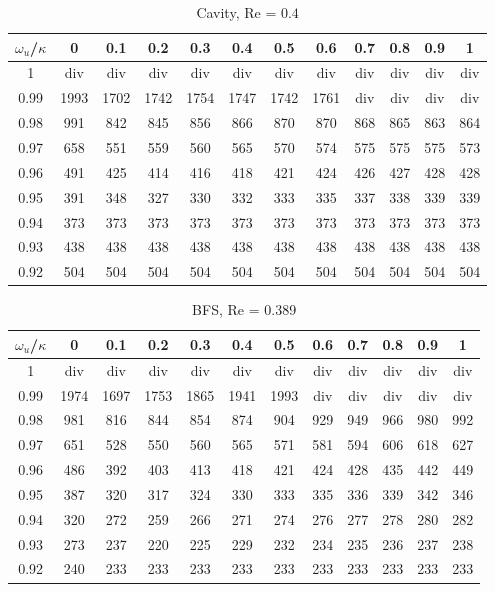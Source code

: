 \documentclass[final,3p,times,10pt,onecolumn]{myElsarticle}
\numberwithin{equation}{section}
\begin{document}
\begin{table}[t!]
\centering
\begin{tabular}{c|ccccccccccc}
\hline 
$\omega_u$/$\kappa$ & 0 & 0.1 & 0.2 & 0.3 & 0.4 & 0.5 & 0.6 & 0.7 & 0.8 & 0.9 & 1 \\ 
\hline 
1 & div & div & div & div & div & div & div & div & div & div & div \\ 
0.99 & 1993 & 1702 & 1742 & 1754 & 1747 & 1742 & 1761 & div & div & div & div \\ 
0.98 & 991 & 842  & 845 & 856 & 866 & 870 & 870 & 868 & 865 & 863 & 864 \\ 
0.97 & 658 & 551  & 559 & 560 & 565 & 570 & 574 & 575 & 575 & 575 & 573 \\ 
0.96 & 491 &425  & 414 & 416 & 418 & 421 & 424 & 426 & 427 & 428 & 428 \\ 
0.95 & 391 & 348 & 327 & 330 & 332 & 333 & 335 & 337 & 338 & 339 & 339 \\ 
0.94 & 373 & 373 & 373 & 373 & 373 & 373 & 373 & 373 & 373 & 373 & 373 \\ 
0.93 & 438 & 438 & 438 & 438 & 438 & 438 & 438 & 438 & 438 & 438 & 438 \\ 
0.92 & 504 & 504 & 504 & 504 & 504 & 504 & 504 & 504 & 504 & 504 & 504 \\ 
\hline 
\end{tabular} 
\caption{Cavity, Re = $0.4$}
\label{Table:Cavity_LowRe}
\end{table}

\begin{table}[t!]
\centering
\begin{tabular}{c|ccccccccccc}
\hline 
$\omega_u$/$\kappa$ & 0 & 0.1 & 0.2 & 0.3 & 0.4 & 0.5 & 0.6 & 0.7 & 0.8 & 0.9 & 1 \\ 
\hline 
1 & div & div & div & div & div & div & div & div & div & div & div \\ 
0.99 & 1974 & 1697 & 1753 & 1865 & 1941 & 1993 & div & div & div & div & div \\ 
0.98 & 981 & 816 & 844 & 854 & 874 & 904 & 929 & 949 & 966 & 980 & 992 \\ 
0.97 & 651 & 528 & 550 & 560 & 565 & 571 & 581 & 594 & 606 & 618 & 627 \\ 
0.96 & 486 & 392 & 403 & 413 & 418 & 421 & 424 & 428 & 435 & 442 & 449 \\ 
0.95 & 387 & 320 & 317 & 324 & 330 & 333 & 335 & 336 & 339 & 342 & 346 \\ 
0.94 & 320 & 272 & 259 & 266 & 271 & 274 & 276 & 277 & 278 & 280 & 282 \\ 
0.93 & 273 & 237 & 220 & 225 & 229 & 232 & 234 & 235 & 236 & 237 & 238 \\ 
0.92 & 240 & 233 & 233 & 233 & 233 & 233 & 233 & 233 & 233 & 233 & 233 \\ 
\hline 
\end{tabular}
\caption{BFS, Re = 0.389}
\label{Table:BFS_LowRe}
\end{table}
\end{document}
